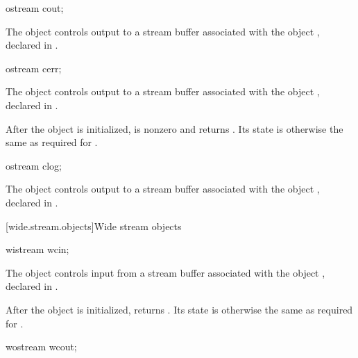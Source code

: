 %
\begin{itemdecl}
ostream cout;
\end{itemdecl}

\begin{itemdescr}
\pnum
The object 
controls output to a stream buffer associated with the object ,
declared in .
\end{itemdescr}

%
\begin{itemdecl}
ostream cerr;
\end{itemdecl}

\begin{itemdescr}
\pnum
The object 
controls output to a stream buffer associated with the object ,
declared in .

\pnum
After the object
is initialized,
is nonzero and  returns .
Its state is otherwise the same as required for
.
\end{itemdescr}

%
\begin{itemdecl}
ostream clog;
\end{itemdecl}

\begin{itemdescr}
\pnum
The object 
controls output to a stream buffer
associated with the object ,
declared in .
\end{itemdescr}

[wide.stream.objects]{Wide stream objects}

%
\begin{itemdecl}
wistream wcin;
\end{itemdecl}

\begin{itemdescr}
\pnum
The object 
controls input from a stream buffer associated with the object ,
declared in .

\pnum
After the object
is initialized,
returns
.
Its state is otherwise the same as required for
.
\end{itemdescr}

%
\begin{itemdecl}
wostream wcout;
\end{itemdecl}

